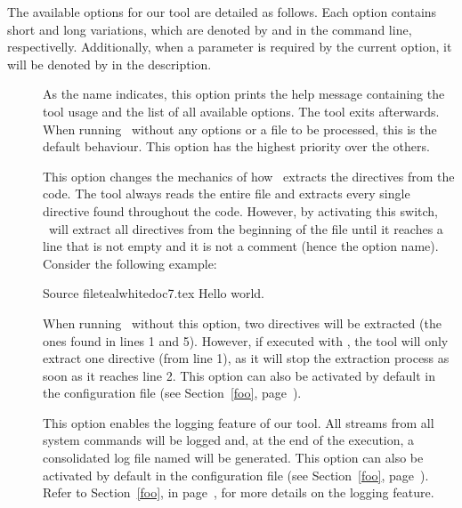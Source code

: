 The available options for our tool are detailed as follows. Each option contains short and long variations, which are denoted by  and  in the command line, respectivelly. Additionally, when a parameter is required by the current option, it will be denoted by  in the description.

\begin{description}
\item[] As the name indicates, this option prints the help message containing the tool usage and the list of all available options. The tool exits afterwards. When running \arara\ without any options or a file to be processed, this is the default behaviour. This option has the highest priority over the others.

\item[] This option changes the mechanics of how \arara\ extracts the directives from the code. The tool always reads the entire file and extracts every single directive found throughout the code. However, by activating this switch, \arara\ will extract all directives from the beginning of the file until it reaches a line that is not empty and it is not a comment (hence the option name). Consider the following example:

\begin{ncodebox}{Source file}{teal}{\icnote}{white}{doc7.tex}
Hello world.
\bye

\end{ncodebox}

When running \arara\ without this option, two directives will be extracted (the ones found in lines 1 and 5). However, if executed with , the tool will only extract one directive (from line 1), as it will stop the extraction process as soon as it reaches line 2. This option can also be activated by default in the configuration file (see Section~\ref{foo}, page~\pageref{foo}).

\item[] This option enables the logging feature of our tool. All streams from all system commands will be logged and, at the end of the execution, a consolidated log file named  will be generated. This option can also be activated by default in the configuration file (see Section~\ref{foo}, page~\pageref{foo}). Refer to Section~\ref{foo}, in page~\pageref{foo}, for more details on the logging feature.


\end{description}
